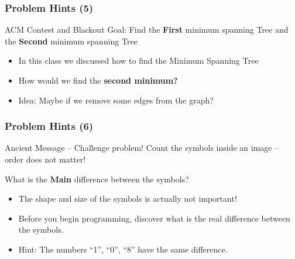 \begin{frame}
  \frametitle{Problem Hints (5)}
  {\smaller
    \begin{block}{ACM Contest and Blackout}
      Goal: Find the {\bf First} minimum spanning Tree and the {\bf
        Second} minimum spanning Tree
    \end{block}

    \bigskip
    
    \begin{itemize}
    \item In this class we discussed how to find the Minimum Spanning Tree      
    \item How would we find the {\bf second minimum?}
    \item Idea: Maybe if we remove some edges from the graph?
    \end{itemize}
  }
\end{frame}

\begin{frame}
  \frametitle{Problem Hints (6)}
  \begin{block}{Ancient Message -- Challenge problem!}
    Count the symbols inside an image -- order does not matter!

    \bigskip

    What is the {\bf Main} difference between the symbols?
  \end{block}
    
  \begin{itemize}
  \item The shape and size of the symbols is actually not important!
  \item Before you begin programming, discover what is the real
    difference between the symbols.
  \item Hint: The numbers ``1'', ``0'', ``8'' have the same difference.
  \end{itemize}    
\end{frame}
